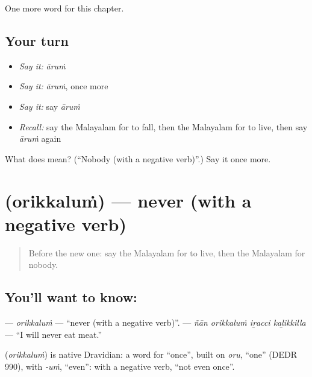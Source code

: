 \begin{grammarlens}[title={What you've built}]
One more word for this chapter.
\end{grammarlens}

\subsection*{Your turn}
\begin{itemize}
\raggedright
  \item \emph{Say it:} \emph{āruṁ}
  \item \emph{Say it:} \emph{āruṁ}, once more
  \item \emph{Say it:} say \emph{āruṁ}
  \item \emph{Recall:} say the Malayalam for to fall, then the Malayalam for to live, then say \emph{āruṁ} again
\end{itemize}

\begin{tcolorbox}[breakable,colback=teal!4,colframe=teal!35!black,title={Before you move on}]
What does  mean? (\textquotedblleft{}Nobody (with a negative verb)\textquotedblright{}.) Say it once more.
\end{tcolorbox}
\section[\texorpdfstring{\ml{ഒരിക്കലും} (orikkaluṁ)}{ഒരിക്കലും (orikkaluṁ)}]{ (orikkaluṁ) — never (with a negative verb)}

\label{lesson:ML-C177-orikkalum}



\begin{quote}
Before the new one: say the Malayalam for to live, then the Malayalam for nobody.
\end{quote}

\subsection*{You'll want to know: }
\textbf{} — \emph{orikkaluṁ} — \textquotedblleft{}never (with a negative verb)\textquotedblright{}. \textbf{   } — \emph{ñān orikkaluṁ iṟacci kaḻikkilla} — \textquotedblleft{}I will never eat meat.\textquotedblright{}

\begin{cousinweb}
\textbf{} (\emph{orikkaluṁ}) is native Dravidian: a word for \textquotedblleft{}once\textquotedblright{}, built on \emph{oru}, \textquotedblleft{}one\textquotedblright{} (DEDR 990), with \emph{-uṁ}, \textquotedblleft{}even\textquotedblright{}: with a negative verb, \textquotedblleft{}not even once\textquotedblright{}.
\end{cousinweb}

